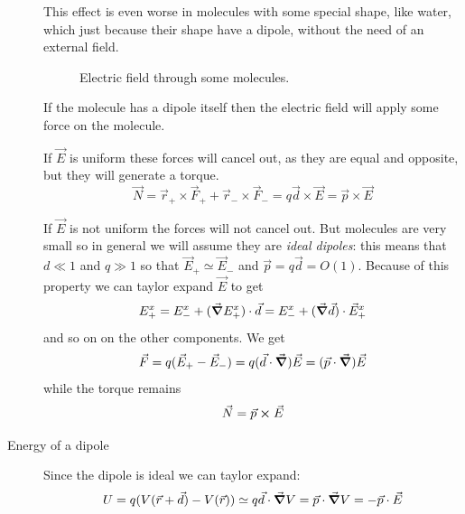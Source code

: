 \documentclass[12pt]{extarticle}
\begin{document}
\begin{description}
	      This effect is even worse in molecules with some special shape, like water, which just because their shape have a dipole, without the need of an external field.

	      \begin{figure}[H]
		      \centering
		      \qquad
		      \subfloat[Water]{}
		      \caption{Electric field through some molecules.}
	      \end{figure}

	      If the molecule has a dipole itself then the electric field will apply some force on the molecule.

	      If $\vec E$ is uniform these forces will  cancel out, as they are equal and opposite, but they will generate a torque.
	      \begin{equation}
		      \vec N = \vec r_+ \times \vec F_+ + \vec r_- \times \vec F_- = q\vec d \times \vec E = \vec p \times \vec E
	      \end{equation}

	      If $\vec E$ is not uniform the forces will not cancel out.
	      But molecules are very small so in general we will assume they are \emph{ideal dipoles}: this means that $d \ll 1$ and $q \gg 1$ so that $\vec E_+ \simeq \vec E_-$ and $\vec p = q\vec d = O(1)$.
	      Because of this property we can taylor expand $\vec E$ to get
	      \begin{equation}
		      E^x_+ = E^x_- + (\grad E^x_+) \cdot \vec d = E^x_- + (\grad \vec d) \cdot \vec E^x_+
	      \end{equation}
	      and so on on the other components.
	      We get
	      \begin{equation}
		      \vec F = q (\vec E_+ - \vec E_-) = q (\vec d \cdot \grad) \vec E = (\vec p \cdot \grad) \vec E
	      \end{equation}
	      while the torque remains
	      \begin{equation}
		      \vec N = \vec p \cross \vec E
	      \end{equation}

	\item[Energy of a dipole]
	      Since the dipole is ideal we can taylor expand:
	      \begin{equation}
		      U = q(V(\vec r + \vec d) - V(\vec r)) \simeq q\vec d \cdot \grad V = \vec p \cdot \grad V = - \vec p \cdot \vec E
	      \end{equation}
\end{description}
\end{document}
